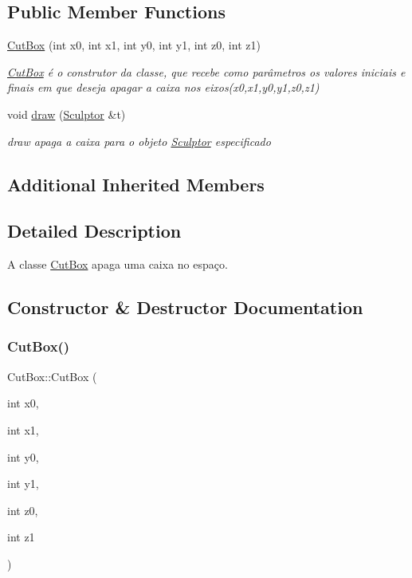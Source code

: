 \subsection*{Public Member Functions}
\begin{DoxyCompactItemize}
\item 
\hyperlink{class_cut_box_a0e7e856f22e31926719bef5a69685051}{Cut\+Box} (int x0, int x1, int y0, int y1, int z0, int z1)
\begin{DoxyCompactList}\small\item\em \hyperlink{class_cut_box}{Cut\+Box} é o construtor da classe, que recebe como parâmetros os valores iniciais e finais em que deseja apagar a caixa nos eixos(x0,x1,y0,y1,z0,z1) \end{DoxyCompactList}\item 
void \hyperlink{class_cut_box_a01216b04bf5a2d01ce1fb89f3fa62a46}{draw} (\hyperlink{class_sculptor}{Sculptor} \&t)
\begin{DoxyCompactList}\small\item\em draw apaga a caixa para o objeto \hyperlink{class_sculptor}{Sculptor} especificado \end{DoxyCompactList}\end{DoxyCompactItemize}
\subsection*{Additional Inherited Members}


\subsection{Detailed Description}
A classe \hyperlink{class_cut_box}{Cut\+Box} apaga uma caixa no espaço. 

\subsection{Constructor \& Destructor Documentation}
\mbox{\label{class_cut_box_a0e7e856f22e31926719bef5a69685051}} 
\subsubsection{\texorpdfstring{Cut\+Box()}{CutBox()}}
{\footnotesize\ttfamily Cut\+Box\+::\+Cut\+Box (\begin{DoxyParamCaption}\item[{int}]{x0,  }\item[{int}]{x1,  }\item[{int}]{y0,  }\item[{int}]{y1,  }\item[{int}]{z0,  }\item[{int}]{z1 }\end{DoxyParamCaption})}



